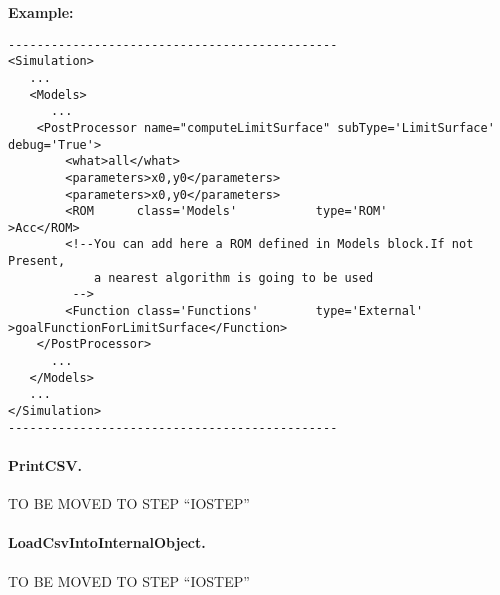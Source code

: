 \textbf{Example:}
\begin{lstlisting}[style=XML]
----------------------------------------------
<Simulation>
   ...
   <Models>
      ...
    <PostProcessor name="computeLimitSurface" subType='LimitSurface' debug='True'>
        <what>all</what>
        <parameters>x0,y0</parameters>
        <parameters>x0,y0</parameters>
        <ROM      class='Models'           type='ROM'             >Acc</ROM>
        <!--You can add here a ROM defined in Models block.If not Present,
            a nearest algorithm is going to be used
         -->
        <Function class='Functions'        type='External'        >goalFunctionForLimitSurface</Function>
    </PostProcessor>
      ...
   </Models>
   ...
</Simulation>
----------------------------------------------
\end{lstlisting}
\paragraph{PrintCSV.}
\label{PrintCSV}
TO BE MOVED TO STEP ``IOSTEP''
\paragraph{LoadCsvIntoInternalObject.}
\label{LoadCsvIntoInternalObject}
TO BE MOVED TO STEP ``IOSTEP''
